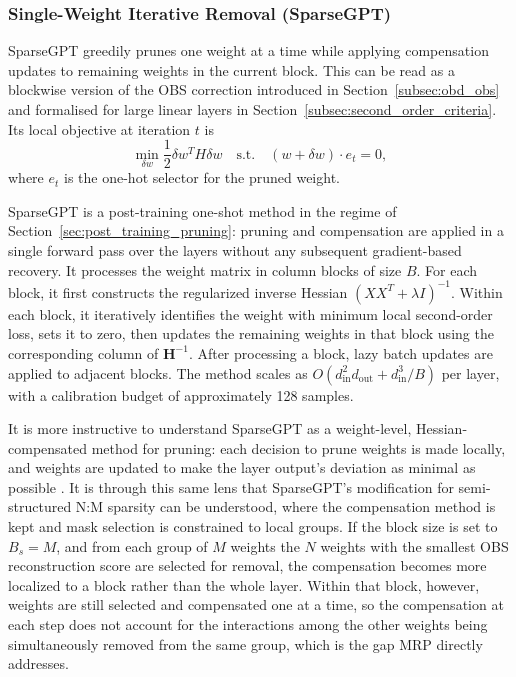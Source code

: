 \subsubsection{Single-Weight Iterative Removal (SparseGPT)}

SparseGPT \cite{frantar2023sparsegpt} greedily prunes one weight at a time while applying compensation updates to remaining weights in the current block. This can be read as a blockwise version of the OBS correction introduced in Section~\ref{subsec:obd_obs} and formalised for large linear layers in Section~\ref{subsec:second_order_criteria}. Its local objective at iteration $t$ is
\begin{equation}\label{eq:srp}
	\min_{\delta w} \frac{1}{2}\delta w^T H \delta w
	\quad\text{s.t.}\quad
	(w+\delta w)\cdot e_t = 0,
\end{equation}
where $e_t$ is the one-hot selector for the pruned weight.

SparseGPT is a post-training one-shot method in the regime of Section~\ref{sec:post_training_pruning}: pruning and compensation are applied in a single forward pass over the layers without any subsequent gradient-based recovery. It processes the weight matrix in column blocks of size $B$. For each block, it first constructs the regularized inverse Hessian $(XX^T + \lambda I)^{-1}$. Within each block, it iteratively identifies the weight with minimum local second-order loss, sets it to zero, then updates the remaining weights in that block using the corresponding column of $\mathbf{H}^{-1}$. After processing a block, lazy batch updates are applied to adjacent blocks. The method scales as $O(d_{\text{in}}^2 d_{\text{out}} + d_{\text{in}}^3/B)$ per layer, with a calibration budget of approximately 128 samples.

It is more instructive to understand SparseGPT as a weight-level, Hessian-compensated method for pruning: each decision to prune weights is made locally, and weights are updated to make the layer output's deviation as minimal as possible \cite{frantar2023sparsegpt}. It is through this same lens that SparseGPT's modification for semi-structured N:M sparsity can be understood, where the compensation method is kept and mask selection is constrained to local groups. If the block size is set to $B_s = M$, and from each group of $M$ weights the $N$ weights with the smallest OBS reconstruction score are selected for removal, the compensation becomes more localized to a block rather than the whole layer. Within that block, however, weights are still selected and compensated one at a time, so the compensation at each step does not account for the interactions among the other weights being simultaneously removed from the same group, which is the gap MRP directly addresses.

